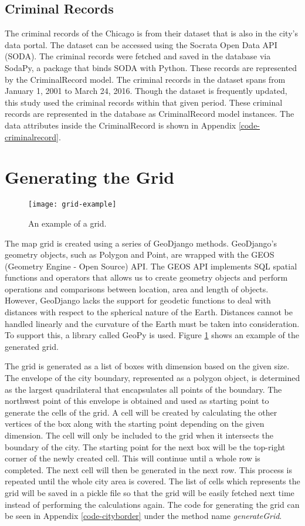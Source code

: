     \subsection{Criminal Records}
        The criminal records of the Chicago is from their dataset that is also in the city's data portal. The dataset can be accessed using the Socrata Open Data API (SODA). The criminal records were fetched and saved in the database via SodaPy, a package that binds SODA with Python. These records are represented by the CriminalRecord model. The criminal records in the dataset spans from January 1, 2001 to March 24, 2016. Though the dataset is frequently updated, this study used the criminal records within that given period. These criminal records are represented in the database as CriminalRecord model instances. The data attributes inside the CriminalRecord is shown in Appendix \ref{code-criminalrecord}.

\section{Generating the Grid}
    \begin{figure}[H]
    \centering
    \texttt{[image: grid-example]}
    \caption{An example of a grid.}
    \label{fig:grid}
    \end{figure}
    The map grid is created using a series of GeoDjango methods. GeoDjango's geometry objects, such as Polygon and Point, are wrapped with the GEOS (Geometry Engine - Open Source) API. The GEOS API implements SQL spatial functions and operators that allows us to create geometry objects and perform operations and comparisons between location, area and length of objects. However, GeoDjango lacks the support for geodetic functions to deal with distances with respect to the spherical nature of the Earth. Distances cannot be handled linearly and the curvature of the Earth must be taken into consideration. To support this, a library called GeoPy is used. Figure \ref{fig:grid} shows an example of the generated grid.

    The grid is generated as a list of boxes with dimension based on the given size. The envelope of the city boundary, represented as a polygon object, is determined as the largest quadrilateral that encapsulates all points of the boundary. The northwest point of this envelope is obtained and used as starting point to generate the cells of the grid. A cell will be created by calculating the other vertices of the box along with the starting point depending on the given dimension. The cell will only be included to the grid when it intersects the boundary of the city. The starting point for the next box will be the top-right corner of the newly created cell. This will continue until a whole row is completed. The next cell will then be generated in the next row. This process is repeated until the whole city area is covered. The list of cells which represents the grid will be saved in a pickle file so that the grid will be easily fetched next time instead of performing the calculations again. The code for generating the grid can be seen in Appendix \ref{code-cityborder} under the method name \textit{generateGrid}.

